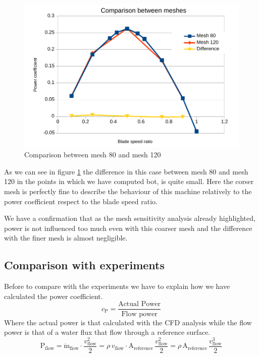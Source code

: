 \documentclass[a4paper,12pt]{article}
\begin{document}
\begin{figure}[hbtp]
\centering
\includegraphics[width=15cm]{images/bsr/bsr-mesh80-120.pdf}
\caption{Comparison between mesh 80 and mesh 120}
\label{fig:bsr-comparison-80-120}
\end{figure}

As we can see in figure \ref{fig:bsr-comparison-80-120} the difference in this case between mesh 80 and mesh 120 in the points in which we have computed bot, is quite small.
Here the corser mesh is perfectly fine to describe the behaviour of this machine relatively to the power coefficient respect to the blade speed ratio.

We have a confirmation that as the mesh sensitivity analysis already highlighted, power is not influenced too much even with this coarser mesh and the difference with the finer mesh is almost negligible.

\subsection{Comparison with experiments}

Before to compare with the experiments we have to explain how we have calculated the power coefficient.
\begin{equation}
c_\text{P} = \dfrac{\text{Actual Power}}{\text{Flow power}}
\end{equation}
Where the actual power is that calculated with the CFD analysis while the flow power is that of a water flux that flow through a reference surface. 
\begin{equation}
\text{P}_\text{flow} 
= \dot{\text{m}}_\text{flow} \cdot \dfrac{v^2_\text{flow}}{2} 
= \rho \, v_\text{flow} \cdot \text{A}_\text{reference} \, \dfrac{v^2_\text{flow}}{2} 
= \rho \, \text{A}_\text{reference} \, \dfrac{v^3_\text{flow}}{2}
\end{equation}
\end{document}
